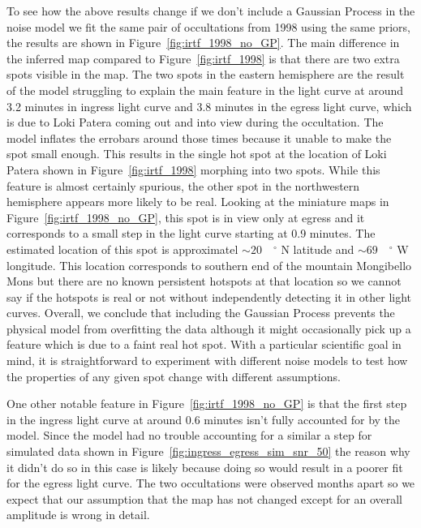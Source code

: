 \documentclass[linenumbers,modern]{aastex62}
\begin{document}
To see how the above results change if we don't include a Gaussian Process in the noise model we fit the same pair of occultations from 1998 using the same priors, the results are shown in Figure~\ref{fig:irtf_1998_no_GP}.
The main difference in the inferred map compared to Figure~\ref{fig:irtf_1998} is that there are two extra spots visible in the map.
The two spots in the eastern hemisphere are the result of the model struggling to explain the main feature in the light curve at around 3.2 minutes in ingress light curve and 3.8 minutes in the egress light curve, which is due to  Loki Patera coming out and into view during the occultation.
The model inflates the errobars around those times because it unable to make the spot small enough.
This results in the single hot spot at the location of Loki Patera shown in Figure~\ref{fig:irtf_1998} morphing into two spots.
While this feature is almost certainly spurious, the other spot in the northwestern hemisphere appears more likely to be real.
Looking at the miniature maps in Figure~\ref{fig:irtf_1998_no_GP}, this spot is in view only at egress and it corresponds to a small step in the light curve starting at 0.9 minutes.
The estimated location of this spot is approximatel $\sim 20\quad^\circ$ N latitude and $\sim 69\quad^\circ$ W longitude.
This location corresponds to southern end of the mountain Mongibello Mons but there are no known persistent hotspots at that location so we cannot say if the hotspots is real or not without independently detecting it in other light curves.
Overall, we conclude that including the Gaussian Process prevents the physical model from overfitting the data although it might occasionally pick up a feature which is due to a faint real hot spot.
With a particular scientific goal in mind, it is straightforward to experiment with different noise models to test how the properties of any given spot change with different assumptions.


One other notable feature in Figure~\ref{fig:irtf_1998_no_GP} is that the first step in the ingress light curve at around 0.6 minutes isn't fully accounted for by the model.
Since the model had no trouble accounting for a similar a step for simulated data shown in Figure~\ref{fig:ingress_egress_sim_snr_50} the reason why it didn't do so in this case is likely because doing so would result in a poorer fit for the egress light curve.
The two occultations were observed months apart so we expect that our assumption that the map has not changed except for an overall amplitude is wrong in detail.  
\end{document}
